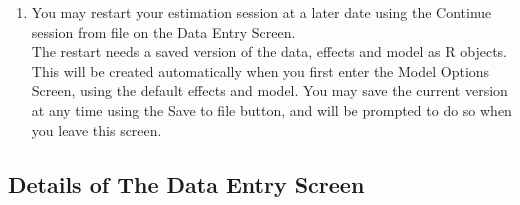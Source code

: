 \documentclass[a4paper,fleqn]{article}
\newcommand{\+}{\, + \,}
\newcommand{\sfn}[1]{\textsf{#1}}
\begin{document}
{\begin{enumerate}
  is stored, with extension \texttt{.out} in the directory in which you start
  \sfn{siena.exe}.
\item You may restart your estimation session at a later date using the
  \sfn{Continue session from file} on the \sfn{Data Entry Screen}.\\
  The restart needs a saved version of the data, effects and model as R
  objects. This will be created automatically when you first enter the
  \sfn{Model Options Screen}, using the default effects and model. You may save
  the current version at any time using the \sfn{Save to file} button, and will
  be prompted to do so when you leave this screen.
\end{enumerate}

\subsection{Details of The Data Entry Screen}
\label{S_de_screen}

}
\end{document}

